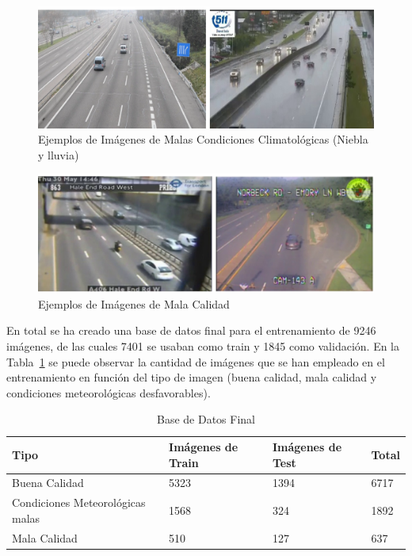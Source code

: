\begin{figure}
\begin{center}
	\includegraphics[width=1\textwidth]{figures/Experimentos/malas_condiciones.png}
   \caption{Ejemplos de Imágenes de Malas Condiciones Climatológicas (Niebla y lluvia)}
	\label{fig.malas_condiciones}
\end{center}
\end{figure}

\begin{figure}
\begin{center}
	\includegraphics[width=1\textwidth]{figures/Experimentos/mala_calidad.png}
   \caption{Ejemplos de Imágenes de Mala Calidad}
	\label{fig.mala_calidad}
\end{center}
\end{figure}

En total se ha creado una base de datos final para el entrenamiento de 9246 imágenes, de las cuales 7401 se usaban como train y 1845 como validación. En la Tabla~\ref{base_datos_final_train} se puede observar la cantidad de imágenes que se han empleado en el entrenamiento en función del tipo de imagen (buena calidad, mala calidad y condiciones meteorológicas desfavorables).

\begin{table}[htbp]
\begin{center}
\begin{tabular}{|l|l|l|l|}
\hline
Tipo  & Imágenes de Train & Imágenes de Test & Total \\
\hline \hline
Buena Calidad & 5323 &  1394 & 6717 \\ \hline
Condiciones Meteorológicas malas & 1568 & 324 & 1892 \\ \hline
Mala Calidad & 510 & 127 & 637 \\ \hline
\end{tabular}
\caption{Base de Datos Final}
\label{base_datos_final_train}
\end{center}
\end{table}

